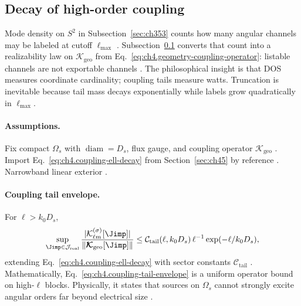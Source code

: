 ﻿\subsection{Decay of high-order coupling}
\label{sec:ch463}

Mode density on \(S^{2}\) in Subsection~\ref{sec:ch353} counts how many angular channels may be labeled at cutoff \(\ell_{\max}\)
\cite{jackson1999,hansen1988}. Subsection~\ref{sec:ch463} converts that count into a realizability law on
\(\boldsymbol{\mathcal{K}}_{\mathrm{geo}}\) from Eq.~\eqref{eq:ch4.geometry-coupling-operator}: listable channels are not exportable
channels \cite{stratton1941,harrington2001,devaney2004}. The philosophical insight is that DOS measures coordinate cardinality; coupling tails
measure watts. Truncation is inevitable because tail mass decays exponentially while labels grow quadratically in \(\ell_{\max}\).

\paragraph{Assumptions.}
Fix compact \(\Omega_{s}\) with \(\operatorname{diam}=D_{s}\), flux gauge, and coupling operator \(\boldsymbol{\mathcal{K}}_{\mathrm{geo}}\)
\cite{stratton1941,hansen1988}. Import Eq.~\eqref{eq:ch4.coupling-ell-decay} from Section~\ref{sec:ch45} by reference
\cite{harrington2001,devaney2004}. Narrowband linear exterior \cite{jackson1999}.

\paragraph{Coupling tail envelope.}
For \(\ell>k_{0}D_{s}\),
\begin{equation}
\label{eq:ch4.coupling-tail-envelope}
\sup_{\Jimp\in\mathcal{J}_{\mathrm{real}}}
\frac{|\mathcal{K}_{\ell m}^{(\sigma)}[\Jimp]|}{\|\boldsymbol{\mathcal{K}}_{\mathrm{geo}}[\Jimp]\|}
\le
\mathcal{C}_{\mathrm{tail}}(\ell,k_{0}D_{s})\,
\ell^{-1}\exp(-\ell/k_{0}D_{s}),
\end{equation}
extending Eq.~\eqref{eq:ch4.coupling-ell-decay} with sector constants \(\mathcal{C}_{\mathrm{tail}}\)
\cite{hansen1988,stratton1941,jackson1999}. Mathematically, Eq.~\eqref{eq:ch4.coupling-tail-envelope} is a uniform operator bound on
high-\(\ell\) blocks. Physically, it states that sources on \(\Omega_{s}\) cannot strongly excite angular orders far beyond electrical size
\cite{harrington2001,devaney2004}.

